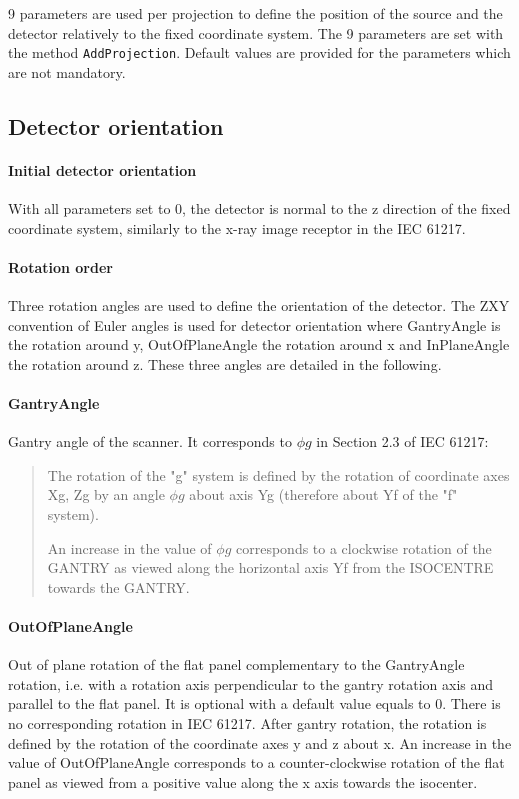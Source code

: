 \documentclass{article}
\newcommand{\biec}{\begin{quote}\begin{small}}
\newcommand{\eiec}{\end{small}\end{quote}}
\begin{document}
9 parameters are used per projection to define the position of the source and the detector relatively to the fixed coordinate system. The 9 parameters are set with the method \verb+AddProjection+. Default values are provided for the parameters which are not mandatory.

\subsection{Detector orientation}

\paragraph{Initial detector orientation}

With all parameters set to 0, the detector is normal to the z direction of the fixed coordinate system, similarly to the x-ray image receptor in the IEC 61217.

\paragraph{Rotation order} Three rotation angles are used to define the orientation of the detector. The ZXY convention of Euler angles is used for detector orientation where GantryAngle is the rotation around y, OutOfPlaneAngle the rotation around x and InPlaneAngle the rotation around z. These three angles are detailed in the following.

\paragraph{GantryAngle}

Gantry angle of the scanner. It corresponds to $\phi g$ in Section 2.3 of IEC 61217:

\biec
The rotation of the "g" system is defined by the rotation of coordinate axes Xg, Zg by an angle $\phi g$ about axis Yg (therefore about Yf of the "f" system).

An increase in the value of $\phi g$ corresponds to a clockwise rotation of the GANTRY as viewed along the horizontal axis Yf from the ISOCENTRE towards the GANTRY.
\eiec

\paragraph{OutOfPlaneAngle}

Out of plane rotation of the flat panel complementary to the GantryAngle rotation, i.e. with a rotation axis perpendicular to the gantry rotation axis and parallel to the flat panel. It is optional with a default value equals to 0. There is no corresponding rotation in IEC 61217. After gantry rotation, the rotation is defined by the rotation of the coordinate axes y and z about x. An increase in the value of OutOfPlaneAngle corresponds to a counter-clockwise rotation of the flat panel as viewed from a positive value along the x axis towards the isocenter.
\end{document}
